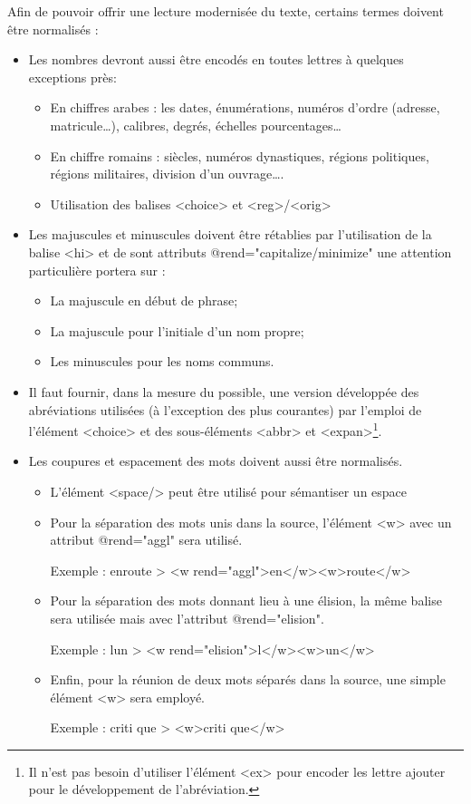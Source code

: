 \documentclass[12pt,a4paper,oneside]{book} %
\begin{document}
Afin de pouvoir offrir une lecture modernisée du texte, certains termes doivent être normalisés :
\begin{itemize}
\item Les nombres devront aussi être encodés en toutes lettres à quelques exceptions près: 
	\begin{itemize}
	\item En chiffres arabes : les dates, énumérations, numéros d'ordre (adresse, matricule\dots), calibres, degrés, échelles pourcentages\dots
	\item En chiffre romains : siècles, numéros dynastiques, régions politiques, régions militaires, division d'un ouvrage\dots.
	\item Utilisation des balises <choice> et <reg>/<orig>
	\end{itemize}
\item Les majuscules et minuscules doivent être rétablies par l'utilisation de la balise <hi> et de sont attributs @rend="capitalize/minimize" une attention particulière portera sur :
	\begin{itemize}
	\item La majuscule en début de phrase; 
	\item La majuscule pour l'initiale d'un nom propre;
	\item Les minuscules pour les noms communs.
	\end{itemize}
\item Il faut fournir, dans la mesure du possible, une version développée des abréviations utilisées (à l'exception des plus courantes) par l'emploi de l'élément <choice> et des sous-éléments <abbr> et <expan>\footnote{Il n'est pas besoin d'utiliser l'élément <ex> pour encoder les lettre ajouter pour le développement de l'abréviation.}.
\item Les coupures et espacement des mots doivent aussi être normalisés. 
	\begin{itemize}
	\item L'élément <space/> peut être utilisé pour sémantiser un espace 
	\item Pour la séparation des mots unis dans la source, l'élément <w> avec un attribut @rend="aggl" sera utilisé. 
	
	Exemple : enroute > <w rend="aggl">en</w><w>route</w>
	\item Pour la séparation des mots donnant lieu à une élision, la même balise sera utilisée mais avec l'attribut @rend="elision". 
	
	Exemple : lun > <w rend="elision">l</w><w>un</w>
	\item Enfin, pour la réunion de deux mots séparés dans la source, une simple élément <w> sera employé. 
	
	Exemple : criti que > <w>criti que</w>   
	\end{itemize}
\end{itemize}
\end{document}
